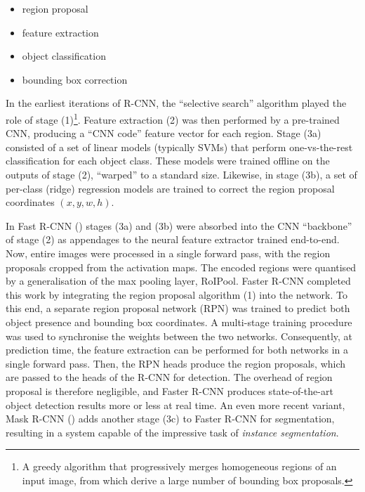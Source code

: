 \begin{itemize}
\item[(1)] region proposal
\item[(2)] feature extraction
\item[(3a)] object classification 
\item[(3b)] bounding box correction
\end{itemize}

In the earliest iterations of R-CNN, the ``selective search'' algorithm played the role of stage (1)\footnote{A greedy algorithm that progressively merges homogeneous regions of an input image, from which derive a large number of bounding box proposals.}. Feature extraction (2) was then performed by a pre-trained CNN, producing a ``CNN code'' feature vector for each region. Stage (3a) consisted of a set of linear models (typically SVMs) that perform one-vs-the-rest classification for each object class. These models were trained offline on the outputs of stage (2), ``warped'' to a standard size. Likewise, in stage (3b), a set of per-class (ridge) regression models are trained to correct the region proposal coordinates $(x, y, w, h)$.

In Fast R-CNN (\cite{girshick2015fast}) stages (3a) and (3b) were absorbed into the CNN ``backbone'' of stage (2) as appendages to the neural feature extractor trained end-to-end. Now, entire images were processed in a single forward pass, with the region proposals cropped from the activation maps. The encoded regions were quantised by a generalisation of the max pooling layer, RoIPool. Faster R-CNN \cite{ren2015faster} completed this work by integrating the region proposal algorithm (1) into the network. To this end, a separate region proposal network (RPN) was trained to predict both object presence and bounding box coordinates. A multi-stage training procedure was used to synchronise the weights between the two networks. Consequently, at prediction time, the feature extraction can be performed for both networks in a single forward pass. Then, the RPN heads produce the region proposals, which are passed to the heads of the R-CNN for detection. The overhead of region proposal is therefore negligible, and Faster R-CNN produces state-of-the-art object detection results more or less at real time. An even more recent variant, Mask R-CNN (\cite{he2017mask}) adds another stage (3c) to Faster R-CNN for segmentation, resulting in a system capable of the impressive task of \emph{instance segmentation}.


